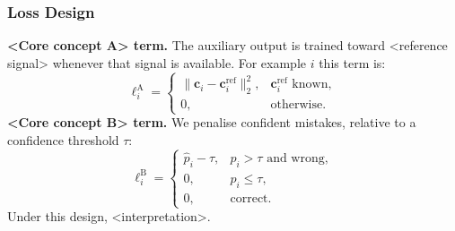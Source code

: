 \subsubsection{Loss Design} \label{sec:loss-design}
\textbf{<Core concept A> term.}
The auxiliary output is trained toward <reference signal> whenever that signal is available.
For example $i$ this term is:
\begin{equation}
\ell_{i}^{\text{A}} =
\begin{cases}
  \|\mathbf{c}_{i} - \mathbf{c}_{i}^{\text{ref}}\|_{2}^{2}, & \mathbf{c}_{i}^{\text{ref}} \text{ known}, \\
  0, & \text{otherwise}.
\end{cases}
\end{equation}
\textbf{<Core concept B> term.}
We penalise confident mistakes, relative to a confidence threshold $\tau$:
\begin{equation}
\ell_{i}^{\text{B}} =
\begin{cases}
  \hat{p}_{i} - \tau, & \hat{p}_{i} > \tau \text{ and wrong},\\
  0, & \hat{p}_{i} \leq \tau, \\
  0, & \text{correct}.
\end{cases}
\end{equation}
Under this design, <interpretation>.

